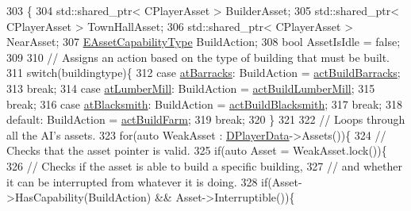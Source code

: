\begin{DoxyCode}
303                                                                                                          \{
304     std::shared\_ptr< CPlayerAsset > BuilderAsset;
305     std::shared\_ptr< CPlayerAsset > TownHallAsset;
306     std::shared\_ptr< CPlayerAsset > NearAsset;
307     \hyperlink{GameDataTypes_8h_a35b98ce26aca678b03c6f9f76e4778ce}{EAssetCapabilityType} BuildAction;
308     \textcolor{keywordtype}{bool} AssetIsIdle = \textcolor{keyword}{false};
309     
310     \textcolor{comment}{// Assigns an action based on the type of building that must be built.}
311     \textcolor{keywordflow}{switch}(buildingtype)\{
312         \textcolor{keywordflow}{case} \hyperlink{GameDataTypes_8h_a5600d4fc433b83300308921974477feca1cbf6c944f30d615a247eef1f57b2230}{atBarracks}:    BuildAction = \hyperlink{GameDataTypes_8h_a35b98ce26aca678b03c6f9f76e4778ceaea47e79df21160eb97064a18e6d36cac}{actBuildBarracks};
313                             \textcolor{keywordflow}{break};
314         \textcolor{keywordflow}{case} \hyperlink{GameDataTypes_8h_a5600d4fc433b83300308921974477feca7bb38316bc3193b5c9ec67ea6aad549c}{atLumberMill}:  BuildAction = \hyperlink{GameDataTypes_8h_a35b98ce26aca678b03c6f9f76e4778ceaea7fb8009561a58e7b9f2cf741989242}{actBuildLumberMill};
315                             \textcolor{keywordflow}{break};
316         \textcolor{keywordflow}{case} \hyperlink{GameDataTypes_8h_a5600d4fc433b83300308921974477feca2b2badd6cba3212eef87ac295bf9642e}{atBlacksmith}:  BuildAction = \hyperlink{GameDataTypes_8h_a35b98ce26aca678b03c6f9f76e4778cea45224b077989530810879da4e225eac7}{actBuildBlacksmith};
317                             \textcolor{keywordflow}{break};
318         \textcolor{keywordflow}{default}:            BuildAction = \hyperlink{GameDataTypes_8h_a35b98ce26aca678b03c6f9f76e4778cea4de8df4d0a9c3bb6fe33e380bc407078}{actBuildFarm};
319                             \textcolor{keywordflow}{break};
320     \}
321 
322     \textcolor{comment}{// Loops through all the AI's assets.}
323     \textcolor{keywordflow}{for}(\textcolor{keyword}{auto} WeakAsset : \hyperlink{classCAIPlayer_a83b5113c8f7e80df54940b647c5ee2e6}{DPlayerData}->Assets())\{
324         \textcolor{comment}{// Checks that the asset pointer is valid.}
325         \textcolor{keywordflow}{if}(\textcolor{keyword}{auto} Asset = WeakAsset.lock())\{
326             \textcolor{comment}{// Checks if the asset is able to build a specific building, }
327             \textcolor{comment}{// and whether it can be interrupted from whatever it is doing.}
328             \textcolor{keywordflow}{if}(Asset->HasCapability(BuildAction) && Asset->Interruptible())\{

\end{DoxyCode}

